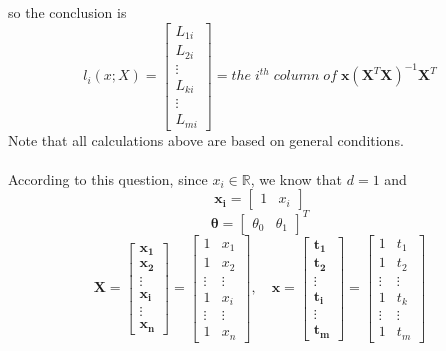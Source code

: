 \documentclass{article}
\begin{document}
		so the conclusion is
        \begin{equation}
            l_i(x; X) = 
            \begin{bmatrix} 
    		L_{1i}\\L_{2i}\\\vdots\\L_{ki}\\\vdots\\L_{mi}
    		\end{bmatrix}=
    		the \; i^{th} \; column \; of \; \boldsymbol{x} (\boldsymbol{X}^T\boldsymbol{X})^{-1}\boldsymbol{X}^T
        \end{equation}
        Note that all calculations above are based on general conditions.\\\\
        According to this question, since $x_i \in \mathbb{R}$, we know that $d=1$ and
        \begin{equation}
       		\boldsymbol{x_i} = \begin{bmatrix} 
    			1&x_i
    			\end{bmatrix}
    	\end{equation}
    	\begin{equation}
       		\boldsymbol{\theta} = \begin{bmatrix} 
    			\theta_0&\theta_1
    			\end{bmatrix}^T
       	\end{equation}
       	\begin{equation}
           	\boldsymbol{X} = \begin{bmatrix} 
    			\boldsymbol{x_1}\\\boldsymbol{x_2}\\\vdots\\\boldsymbol{x_i}\\\vdots\\\boldsymbol{x_n}
    			\end{bmatrix}= \begin{bmatrix} 
    			1&x_1\\
    			1&x_2\\
    			\vdots&\vdots\\
    			1&x_i\\
    			\vdots&\vdots\\
    			1&x_n
    			\end{bmatrix},\quad
    			\boldsymbol{x} = \begin{bmatrix} 
    			\boldsymbol{t_1}\\\boldsymbol{t_2}\\\vdots\\\boldsymbol{t_i}\\\vdots\\\boldsymbol{t_m}
    			\end{bmatrix}= \begin{bmatrix} 
    			1&t_1\\
    			1&t_2\\
    			\vdots&\vdots\\
    			1&t_k\\
    			\vdots&\vdots\\
    			1&t_m
    			\end{bmatrix}
       	\end{equation}
\end{document}
